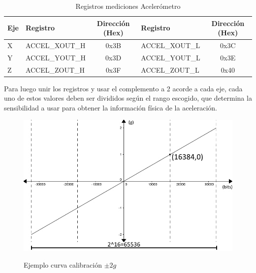 \documentclass[12pt,a4paper]{article}
\begin{document}
\begin{itemize}
	\begin{table}[H]
		\centering
		\label{table:registrosaccel}
		\begin{tabular}{|l|l|c|l|c|}
			\hline
			\textbf{Eje} & \textbf{Registro} & \textbf{Dirección (Hex)} & \textbf{Registro} & \textbf{Dirección (Hex)} \\ \hline
			X            & ACCEL\_XOUT\_H     & 0x3B                     & ACCEL\_XOUT\_L     & 0x3C                     \\ \hline
			Y            & ACCEL\_YOUT\_H     & 0x3D                     & ACCEL\_YOUT\_L     & 0x3E                     \\ \hline
			Z            & ACCEL\_ZOUT\_H     & 0x3F                     & ACCEL\_ZOUT\_L     & 0x40                     \\ \hline
		\end{tabular}
		\caption{Registros mediciones Acelerómetro}					
	\end{table}				
					
	Para luego unir los registros y usar el complemento a 2 acorde a cada eje, cada uno de estos valores deben ser divididos según el rango escogido, que determina la sensibilidad a usar para obtener la información física de la aceleración.
	
	\begin{figure}[H]
		\centering
		\includegraphics[scale=0.6]{images/curvacalibracion}
		\label{fig:curvacalibracion}
		\caption{Ejemplo curva calibración $\pm 2g$}
	\end{figure}
	
\end{itemize}
\end{document}
